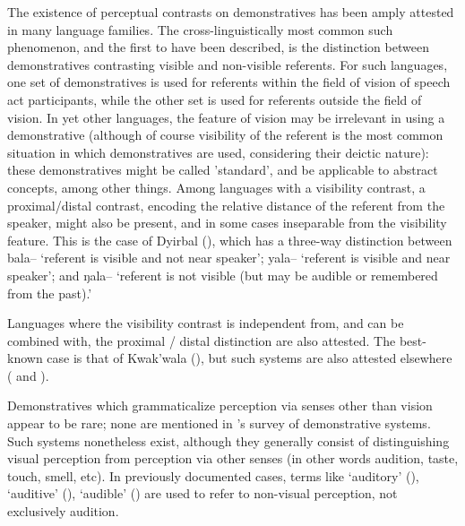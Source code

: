 \documentclass[oldfontcommands,oneside,a4paper,11pt]{article}
\newcommand{\ipa}[1]{{\phon \mbox{#1}}} %
\begin{document}
 The existence of perceptual contrasts on demonstratives has been amply attested in many language families.   The cross-linguistically most common such phenomenon, and the first to have been described, is the   distinction between demonstratives contrasting visible and non-visible referents. For such languages, one set of demonstratives is used for referents within the field of vision of speech act participants, while the other set is used for referents outside the field of vision.  In yet other languages, the feature of vision may be irrelevant in using a demonstrative (although of course visibility of the referent is the most common situation in which demonstratives are used, considering their deictic nature): these demonstratives might be called 'standard', and be applicable to abstract concepts, among other things.  Among languages with a visibility contrast, a proximal/distal contrast, encoding the relative distance of the referent from the speaker, might also be present, and in some cases inseparable from the visibility feature. This is the case   of  Dyirbal (\citealt{dixon72dyirbal}), which has  a three-way distinction between \ipa{bala--} ‘referent is visible and not near speaker’; \ipa{yala--} ‘referent is visible and near speaker’; and \ipa{ŋala--} ‘referent is not visible (but may be audible or remembered from the past).'
 
 
 Languages where the visibility  contrast is independent from, and can be combined with, the proximal / distal distinction are also attested. The best-known case is that of  Kwak'wala (\citealt[527-531]{boas11kwakiutl}), but such systems are also attested elsewhere  (\citealt[130]{aikhenvald06} and \citealt{aikhenvald14knowledge}).


Demonstratives which grammaticalize perception via senses    other than vision appear to be  rare;  none are mentioned in    \citet{diessel99dem}'s survey of demonstrative systems. Such systems nonetheless exist, although they generally consist of distinguishing visual perception from perception via   other senses (in other words audition, taste, touch, smell, etc).  In   previously documented cases, terms like `auditory'  (\citealt[37, ft]{oswalt86evidential}), `auditive'  (\citealt[42-44]{neukom01santali}),  `audible' (\citealt{dixon72dyirbal}) are used to refer to  non-visual perception, not exclusively audition.
\end{document}
